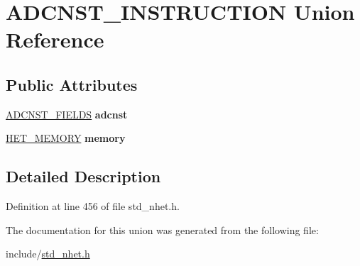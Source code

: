 \hypertarget{unionADCNST__INSTRUCTION}{}\section{A\+D\+C\+N\+S\+T\+\_\+\+I\+N\+S\+T\+R\+U\+C\+T\+I\+ON Union Reference}
\label{unionADCNST__INSTRUCTION}
\subsection*{Public Attributes}
\begin{DoxyCompactItemize}
\item 
\mbox{\label{unionADCNST__INSTRUCTION_ae230af962559709da17a61472bcd044f}} 
\mbox{\hyperlink{structADCNST__format}{A\+D\+C\+N\+S\+T\+\_\+\+F\+I\+E\+L\+DS}} {\bfseries adcnst}
\item 
\mbox{\label{unionADCNST__INSTRUCTION_ab4cf51a90e8288e0abb245e409dba14c}} 
\mbox{\hyperlink{structmemory__format}{H\+E\+T\+\_\+\+M\+E\+M\+O\+RY}} {\bfseries memory}
\end{DoxyCompactItemize}


\subsection{Detailed Description}


Definition at line 456 of file std\+\_\+nhet.\+h.



The documentation for this union was generated from the following file\+:\begin{DoxyCompactItemize}
\item 
include/\mbox{\hyperlink{std__nhet_8h}{std\+\_\+nhet.\+h}}\end{DoxyCompactItemize}
